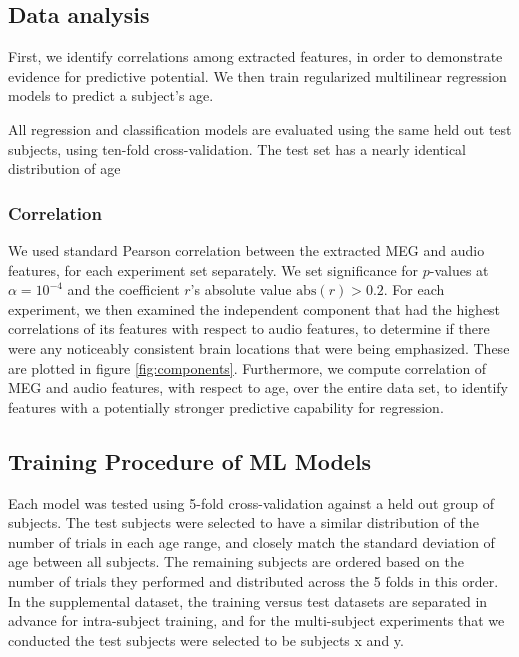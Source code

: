 \documentclass[utf8]{frontiersSCNS} %
\begin{document}
\subsection{Data analysis}

First, we identify correlations among extracted features, in order to demonstrate evidence for predictive potential. We then train regularized multilinear regression models to predict a subject's age.

All regression and classification models are evaluated using the same held out test subjects, using ten-fold cross-validation. The test set has a nearly identical distribution of age

\subsubsection{Correlation}

We used standard Pearson correlation between the extracted MEG and audio features, for each experiment set separately. We set significance for $p$-values at $\alpha = 10^{-4}$ and the coefficient $r$'s absolute value $\text{abs}(r) > 0.2$. For each experiment, we then examined the independent component that had the highest correlations of its features with respect to audio features, to determine if there were any noticeably consistent brain locations that were being emphasized. These are plotted in figure \ref{fig:components}. Furthermore, we compute correlation of MEG and audio features, with respect to age, over the entire data set, to identify features with a potentially stronger predictive capability for regression.

\subsection{Training Procedure of ML Models}

Each model was tested using 5-fold cross-validation against a held out group of subjects. The test subjects were selected to have a similar distribution of the number of trials in each age range, and closely match the standard deviation of age between all subjects. The remaining subjects are ordered based on the number of trials they performed and distributed across the 5 folds in this order. In the supplemental dataset, the training versus test datasets are separated in advance for intra-subject training, and for the multi-subject experiments that we conducted the test subjects were selected to be subjects x and y.
\end{document}
